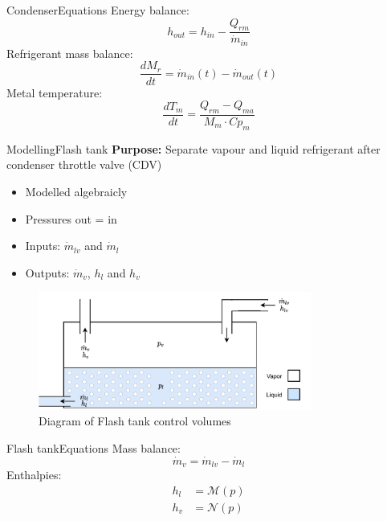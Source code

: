 \begin{frame}{Condenser}{Equations}
	Energy balance:
	\begin{equation}
		h_{out} = h_{in} - \frac{Q_{rm}}{\dot{m}_{in}} \label{eq:Condenser_Enthalpy}
	\end{equation}
	Refrigerant mass balance:
	\begin{equation}
		\frac{dM_r}{dt} 	 = \dot{m}_{in}(t) - \dot{m}_{out}(t) \label{eq:Condenser_ChangeOfMass}
	\end{equation}
	Metal temperature:
	\begin{equation}
		\frac{dT_m}{dt} 	 = \frac{Q_{rm} - Q_{ma}}{M_m \cdot Cp_m} \label{eq:Condenser_ChangeOfTemperature}
	\end{equation}
\end{frame}





\begin{frame}{Modelling}{Flash tank}
	\textbf{Purpose:} Separate vapour and liquid refrigerant after condenser throttle valve (CDV)
	\begin{itemize}
		\item Modelled algebraicly
		\item Pressures out = in
		\item Inputs: $\dot{m}_{lv}$ and $\dot{m}_{l}$
		\item Outputs: $\dot{m}_{v}$, $h_l$ and $h_v$
	\end{itemize}
	\begin{figure}[h!]
		\centering
		\includegraphics[width=0.8\textwidth]{../Graphics/Flash_tank.pdf}
		\caption{Diagram of Flash tank control volumes}
		\label{fig:flash_tank_CV}
	\end{figure}
\end{frame}

\begin{frame}{Flash tank}{Equations}
	Mass balance:
	\begin{equation}
		\dot{m}_{v} = \dot{m}_{lv} - \dot{m}_{l}  \label{eq:Flash_tank_massflow}
	\end{equation}
	Enthalpies:
	\begin{align}
		h_{l}  & = \mathcal{M}(p)\\
		h_{v}  & = \mathcal{N}(p)
	\end{align}
\end{frame}



